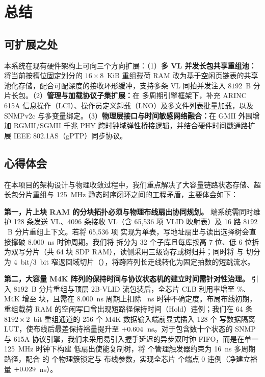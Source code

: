 
\section{总结}

\subsection{可扩展之处}

本系统在现有硬件架构上可向三个方向扩展：（1）\textbf{多 VL 并发长包共享重组池：}将当前按槽位固定划分的 $16\times 8$~KiB 重组载荷 RAM 改为基于空闲页链表的共享池化存储，配合可配深度的接收环形缓冲，支持多条 VL 同拍并发注入 $8192$~B 分片长包。（2）\textbf{管理与加载协议子集扩展：}在  多周期引擎框架下，补充 ARINC 615A 信息操作（LCI）、操作员定义卸载（LNO）及多文件列表批量加载，以及 SNMPv2c  与多变量绑定。（3）\textbf{物理层接口与时间敏感网络融合：}在 GMII 外围增加 RGMII/SGMII 千兆 PHY 跨时钟域弹性桥接逻辑，并结合硬件时间戳通路扩展 IEEE 802.1AS（gPTP）同步协议。

\subsection{心得体会}

在本项目的架构设计与物理收敛过程中，我们重点解决了大容量链路状态存储、超长包分片重组与 125~MHz 静态时序闭环之间的工程矛盾，主要体会如下：

\textbf{第一，片上块 RAM 的分块拓扑必须与物理布线扇出协同规划。}
端系统需同时维护 128 条发送 VL、4096 条接收 VL（含 65,536 项 VLID 映射表）及 16 路 $8192$~B 分片重组上下文。若将 65,536 项  实现为单表，写地址扇出与读出选择树会直接撑破 8.000~ns 时钟周期。我们将  拆分为 32 个子库且每库按高 7 位、低 6 位拆为双写分片（共 64 块 SDP RAM），读侧采用三级寄存或树归并；同时将  与  切分为 4~bit/3~bit 窄返回域切片（），将跨阵列长走线转化为固定拍数的短跳流水。

\textbf{第二，大容量 M4K 阵列的保持时间与协议状态机的建立时间需针对性治理。}
引入 $8192$~B 分片重组与顶层 2B-VLID 流包装后，全芯片 CLB 利用率增至 \ClbPct\%、M4K 增至 \Mem{} 块，且需在 8.000~ns 周期上扣除 \ClkUncert~ns 时钟不确定度。布局布线初期，重组载荷 RAM 的空闲写口曾出现短路径保持时间（Hold）违例；我们在 64 条 $8192\times 2$~bit 重组通道的 256 个 M4K 数据输入端前显式插入 128 个  写数据隔离 LUT，使布线后最差保持裕量提升至 $+0.604$~ns。对于包含数十个状态的 SNMP 与 615A 协议引擎，我们未采用易引入握手延迟的异步双时钟 FIFO，而是在单一 125~MHz 时钟下构建  低扇出使能复制树，将 \countsep{\MulticycleRegs} 个管理触发器约束为 16~ns 多周期路径，配合  的 \countsep{\LockedClusters} 个物理簇锁定与  布线参数，实现全芯片 \countsep{\RoutedEndpoints} 个端点 0 违例（净建立裕量 $+0.029$~ns）。

